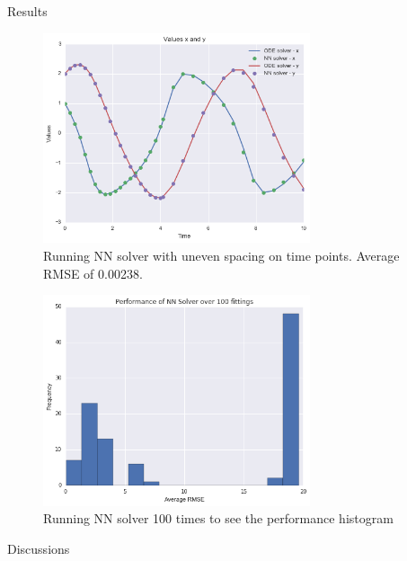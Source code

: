 \documentclass[11pt]{article}
\begin{document}
Results


\begin{figure}
\centering
\includegraphics[width=0.7\textwidth]{VDP_non_uniform.png}
      \caption{Running NN solver with uneven spacing on time points. Average RMSE of 0.00238. \label{fig:VDP_non_uniform}}
\end{figure}


\begin{figure}
\centering
\includegraphics[width=0.7\textwidth]{perf_distribution.png}
      \caption{Running NN solver 100 times to see the performance histogram \label{fig:perf_dist}}
\end{figure}

Discussions


\end{document}
